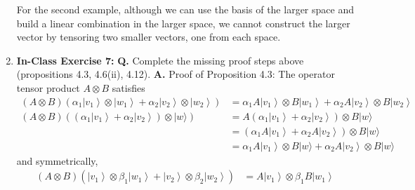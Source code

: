 \documentclass[main.tex]{subfiles}
\begin{document}
\begin{enumerate}
    For the second example, although we can use the basis of the larger space and build a linear combination in the larger space, we cannot construct the larger vector by tensoring two smaller vectors, one from each space.

\item[] \textbf{In-Class Exercise 7:} \textbf{Q.} Complete the missing proof steps above (propositions 4.3, 4.6(ii), 4.12).
    \textbf{A.} Proof of Proposition 4.3: The operator tensor product $A \otimes B$ satisfies
    \begin{align*}
    (A \otimes B)
    \left(\alpha_{1}\left|v_{1}\right\rangle 
    \otimes\left|w_{1}\right\rangle
    +\alpha_{2}\left|v_{2}\right\rangle 
    \otimes\left|w_{2}\right\rangle\right)          & = \alpha_{1}A\left|v_{1}\right\rangle
                                                    \otimes B\left|w_{1}\right\rangle
                                                    +\alpha_{2}A\left|v_{2}\right\rangle
                                                    \otimes B\left|w_{2}\right\rangle \tag{Bilinearity}\\
    (A \otimes B)
    \left(\left(\alpha_{1}\left|v_{1}\right\rangle
    +\alpha_{2}\left|v_{2}\right\rangle\right) 
    \otimes|w\rangle\right)                         & = A\left(\alpha_{1} \left|v_{1}\right\rangle
                                                    +\alpha_{2} \left|v_{2}\right\rangle\right)\otimes B|w\rangle \tag{Bilinearity}\\
                                                    & = \left(\alpha_{1} A\left|v_{1}\right\rangle
                                                    +\alpha_{2} A\left|v_{2}\right\rangle\right)\otimes B|w\rangle 
                                                    \tag{Distribute Operator}\\
                                                    & = \alpha_{1} A\left|v_{1}\right\rangle 
                                                    \otimes B|w\rangle+\alpha_{2}A\left|v_{2}\right\rangle
                                                    \otimes B|w\rangle \tag{Tensor Vectors}
    \end{align*}
    and symmetrically,
    \begin{align*}
        (A \otimes B)
        \left(\left|v_{1}\right\rangle 
        \otimes \beta_{1}\left|w_{1}\right\rangle
        +\left|v_{2}\right\rangle 
        \otimes \beta_{2}\left|w_{2}\right\rangle\right)    & = A\left|v_{1}\right\rangle 
                                                            \otimes \beta_{1} B\left|w_{1}\right\rangle

\end{align*}
\end{enumerate}
\end{document}
